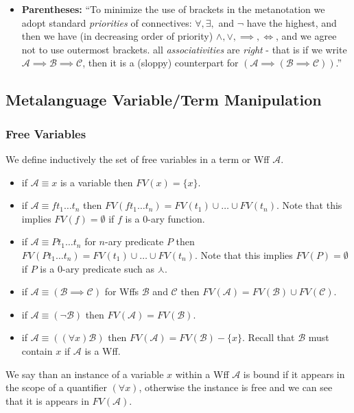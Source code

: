 \documentclass[12pt]{article}
\newcommand{\mc}[1]{\mathcal{#1}}
\begin{document}
\begin{itemize}
\item{\textbf{Parentheses:} ``To minimize the use of brackets in the metanotation we adopt standard \textit{priorities} of connectives: $\forall, \exists,$ and $\lnot$ have the highest, and then we have (in decreasing order of priority) $\land, \lor, \implies, \iff$, and we agree not to use outermost brackets. all \textit{associativities} are \textit{right} - that is if we write $\mc{A} \implies \mc{B} \implies \mc{C}$, then it is a (sloppy) counterpart for $(\mc{A} \implies ( \mc{B} \implies \mc{C}))$.''}
\end{itemize}
\hrulefill

\subsection{Metalanguage Variable/Term Manipulation}

\hrulefill

\subsubsection*{Free Variables}
We define inductively the set of free variables in a term or Wff $\mc{A}$.

\begin{itemize}
\item{if $\mc{A}\equiv x$ is a variable then $FV(x) = \{x\}$.}
\item{if $\mc{A} \equiv ft_1\ldots t_n$ then $FV(ft_1\ldots t_n) = FV(t_1)\cup\ldots\cup FV(t_n)$. Note that this implies $FV(f)=\emptyset$ if $f$ is a 0-ary function.}
\item{if $\mc{A} \equiv Pt_1\ldots t_n$ for $n$-ary predicate $P$ then $FV(Pt_1\ldots t_n) = FV(t_1)\cup\ldots\cup FV(t_n)$. Note that this implies $FV(P)=\emptyset$ if $P$ is a 0-ary predicate such as $\curlywedge$.}
\item{if $\mc{A} \equiv (\mc{B}\implies \mc{C})$ for Wffs $\mc{B}$ and $\mc{C}$ then $FV(\mc{A}) = FV(\mc{B})\cup FV(\mc{C})$.}
\item{if $\mc{A} \equiv (\lnot\mc{B})$ then $FV(\mc{A}) = FV(\mc{B})$.}
\item{if $\mc{A} \equiv ((\forall x)\mc{B})$ then $FV(\mc{A}) = FV(\mc{B}) - \{x\}$. Recall that $\mc{B}$ must contain $x$ if $\mc{A}$ is a Wff.}
\end{itemize}



We say than an instance of a variable $x$ within a Wff $\mc{A}$ is bound if it appears in the scope of a quantifier $(\forall x)$, otherwise the instance is free and we can see that it is appears in $FV(\mc{A})$.
\end{document}

